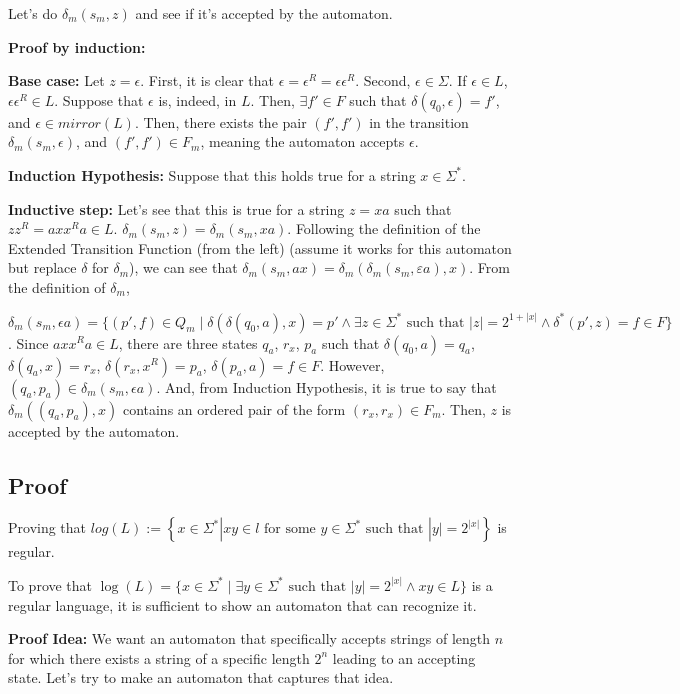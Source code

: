 \documentclass[12pt]{article}
\begin{document}
Let's do $\delta_m (s_m, z)$ and see if it's accepted by the automaton.

\textbf{Proof by induction:}

\textbf{Base case:} Let $z = \epsilon$. First, it is clear that $\epsilon = \epsilon^R = \epsilon\epsilon^R$. Second, $\epsilon \in \Sigma$. If $\epsilon \in L$, $\epsilon\epsilon^R \in L$. Suppose that $\epsilon$ is, indeed, in $L$. Then, $\exists f' \in F$ such that $\delta(q_0, \epsilon) = f'$, and $\epsilon \in mirror(L)$. Then, there exists the pair $(f', f')$ in the transition $\delta_m (s_m, \epsilon)$, and $(f', f') \in F_m$, meaning the automaton accepts $\epsilon$.

\textbf{Induction Hypothesis:} Suppose that this holds true for a string $x \in \Sigma^*$.

\textbf{Inductive step:} Let's see that this is true for a string $z = xa$ such that $zz^R = axx^Ra \in L$. $\delta_m (s_m, z) = \delta_m (s_m, xa)$. Following the definition of the Extended Transition Function (from the left) (assume it works for this automaton but replace $\delta$ for $\delta_m$), we can see that $\delta_m (s_m, ax) = \delta_m (\delta_m (s_m, \varepsilon a), x)$. From the definition of $\delta_m$, 

$\delta_m (s_m, \epsilon a) = \{(p', f) \in Q_m \mid \delta(\delta(q_0, a), x) = p' \land \exists z \in \Sigma^* \text{ such that } |z| = 2^{1+|x|} \land \delta^*(p', z) = f \in F\}$. Since $axx^Ra \in L$, there are three states $q_a$, $r_x$, $p_a$ such that $\delta(q_0, a) = q_a$, $\delta(q_a, x) = r_x$, $\delta(r_x, x^R) = p_a$, $\delta(p_a, a) = f \in F$. However, $(q_a, p_a) \in \delta_m (s_m, \epsilon a)$. And, from Induction Hypothesis, it is true to say that $\delta_m ((q_a, p_a), x)$ contains an ordered pair of the form $(r_x, r_x) \in F_m$. Then, $z$ is accepted by the automaton.

\subsection{Proof}
Proving that $log(L) := \left\{ x \in \Sigma^* | xy \in l \text{ for some } y \in \Sigma^* \text{ such that } |y|=2^{|x|} \right\} $ is regular. 

To prove that $\log(L) = \{x \in \Sigma^* \mid \exists y \in \Sigma^* \text{ such that } |y| = 2^{|x|} \land xy \in L\}$ is a regular language, it is sufficient to show an automaton that can recognize it.

\textbf{Proof Idea:} We want an automaton that specifically accepts strings of length $n$ for which there exists a string of a specific length $2^n$ leading to an accepting state. Let's try to make an automaton that captures that idea.
\end{document}
